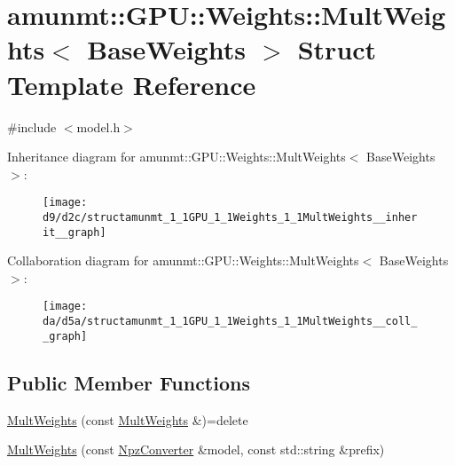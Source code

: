 \hypertarget{structamunmt_1_1GPU_1_1Weights_1_1MultWeights}{}\section{amunmt\+:\+:G\+PU\+:\+:Weights\+:\+:Mult\+Weights$<$ Base\+Weights $>$ Struct Template Reference}
\label{structamunmt_1_1GPU_1_1Weights_1_1MultWeights}


{\ttfamily \#include $<$model.\+h$>$}



Inheritance diagram for amunmt\+:\+:G\+PU\+:\+:Weights\+:\+:Mult\+Weights$<$ Base\+Weights $>$\+:
\nopagebreak
\begin{figure}[H]
\begin{center}
\leavevmode
\texttt{[image: d9/d2c/structamunmt\_1\_1GPU\_1\_1Weights\_1\_1MultWeights\_\_inherit\_\_graph]}
\end{center}
\end{figure}


Collaboration diagram for amunmt\+:\+:G\+PU\+:\+:Weights\+:\+:Mult\+Weights$<$ Base\+Weights $>$\+:
\nopagebreak
\begin{figure}[H]
\begin{center}
\leavevmode
\texttt{[image: da/d5a/structamunmt\_1\_1GPU\_1\_1Weights\_1\_1MultWeights\_\_coll\_\_graph]}
\end{center}
\end{figure}
\subsection*{Public Member Functions}
\begin{DoxyCompactItemize}
\item 
\hyperlink{structamunmt_1_1GPU_1_1Weights_1_1MultWeights_ad21c7d327b55229e3ddb8b09f355079c}{Mult\+Weights} (const \hyperlink{structamunmt_1_1GPU_1_1Weights_1_1MultWeights}{Mult\+Weights} \&)=delete
\item 
\hyperlink{structamunmt_1_1GPU_1_1Weights_1_1MultWeights_a3a442b747e6a1c3e66bf53adea329f3b}{Mult\+Weights} (const \hyperlink{classamunmt_1_1GPU_1_1NpzConverter}{Npz\+Converter} \&model, const std\+::string \&prefix)
\end{DoxyCompactItemize}
